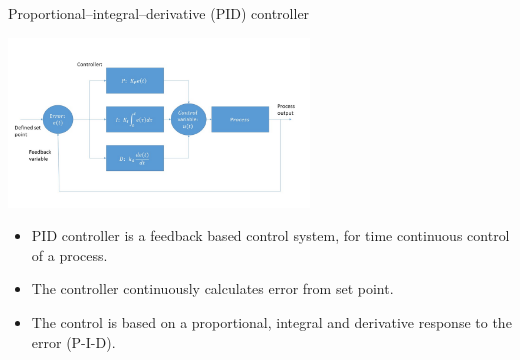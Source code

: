 \documentclass{beamer}
\begin{document}
\begin{frame}{Proportional–integral–derivative (PID) controller}
	\begin{center}		
		\includegraphics[width=0.6\textwidth,keepaspectratio]{pid_diagram_powerpoint.jpg}
    \end{center}
	\begin{itemize}	
		\item PID controller is a feedback based control system, for time continuous control of a process.
		\item The controller continuously calculates error from set point. 
		\pause
		\item The control is based on a proportional, integral and derivative response to the error (P-I-D).
	\end{itemize}
\end{frame}
\end{document}
